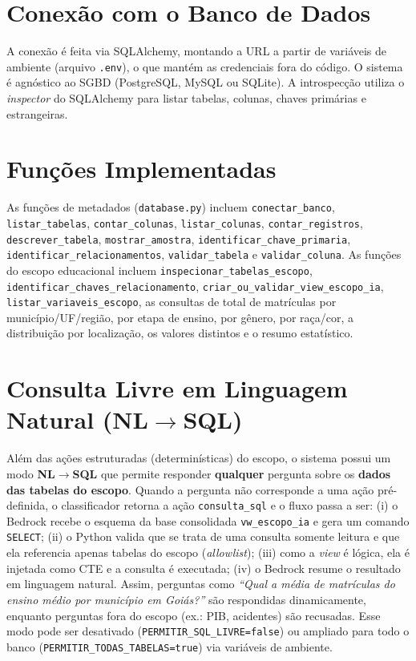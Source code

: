 \documentclass[
    12pt,
    oneside,
    a4paper,
    chapter=TITLE,
    section=TITLE
]{abntex2}
\begin{document}
\section{Conexão com o Banco de Dados}
A conexão é feita via SQLAlchemy, montando a URL a partir de variáveis de ambiente (arquivo
\texttt{.env}), o que mantém as credenciais fora do código. O sistema é agnóstico ao SGBD
(PostgreSQL, MySQL ou SQLite). A introspecção utiliza o \textit{inspector} do SQLAlchemy para listar
tabelas, colunas, chaves primárias e estrangeiras.

\section{Funções Implementadas}
As funções de metadados (\texttt{database.py}) incluem \texttt{conectar\_banco},
\texttt{listar\_tabelas}, \texttt{contar\_colunas}, \texttt{listar\_colunas},
\texttt{contar\_registros}, \texttt{descrever\_tabela}, \texttt{mostrar\_amostra},
\texttt{identificar\_chave\_primaria}, \texttt{identificar\_relacionamentos},
\texttt{validar\_tabela} e \texttt{validar\_coluna}. As funções do escopo educacional incluem
\texttt{inspecionar\_tabelas\_escopo}, \texttt{identificar\_chaves\_relacionamento},
\texttt{criar\_ou\_validar\_view\_escopo\_ia}, \texttt{listar\_variaveis\_escopo}, as consultas de
total de matrículas por município/UF/região, por etapa de ensino, por gênero, por raça/cor, a
distribuição por localização, os valores distintos e o resumo estatístico.

\section{Consulta Livre em Linguagem Natural (NL$\rightarrow$SQL)}
Além das ações estruturadas (determinísticas) do escopo, o sistema possui um modo
\textbf{NL$\rightarrow$SQL} que permite responder \textbf{qualquer} pergunta sobre os
\textbf{dados das tabelas do escopo}. Quando a pergunta não corresponde a uma ação
pré-definida, o classificador retorna a ação \texttt{consulta\_sql} e o fluxo passa a
ser: (i) o Bedrock recebe o esquema da base consolidada \texttt{vw\_escopo\_ia} e gera
um comando \texttt{SELECT}; (ii) o Python valida que se trata de uma consulta somente
leitura e que ela referencia apenas tabelas do escopo (\textit{allowlist}); (iii) como a
\textit{view} é lógica, ela é injetada como CTE e a consulta é executada; (iv) o Bedrock
resume o resultado em linguagem natural. Assim, perguntas como \textit{``Qual a média de
matrículas do ensino médio por município em Goiás?''} são respondidas dinamicamente,
enquanto perguntas fora do escopo (ex.: PIB, acidentes) são recusadas. Esse modo pode ser
desativado (\texttt{PERMITIR\_SQL\_LIVRE=false}) ou ampliado para todo o banco
(\texttt{PERMITIR\_TODAS\_TABELAS=true}) via variáveis de ambiente.
\end{document}
